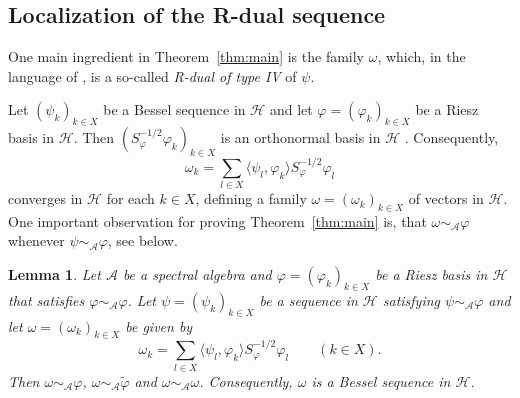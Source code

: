 \documentclass{amsart}
\newtheorem{lem.}[theorem]{Lemma}
\def\Hil{\mathcal{H}}
\newcommand{\A}[0]{{\mathcal{A}}}
\begin{document}
\subsection{Localization of the R-dual sequence}

One main ingredient in Theorem~\ref{thm:main} is the family $\omega$, which, in the language of \cite{r-duals}, is a so-called \emph{R-dual of type IV} of $\psi$. 

Let $(\psi_k)_{k\in X}$ be a Bessel sequence in $\Hil$ and let $\varphi = (\varphi_k)_{k\in X}$ be a Riesz basis in $\Hil$. Then $(S_{\varphi}^{-1/2}\varphi_k)_{k\in X}$ is an orthonormal basis in $\Hil$ \cite{ole1n}. Consequently, 
$$\omega_k = \sum_{l\in X}\langle \psi_l , \varphi_k \rangle S_{\varphi}^{- {1}/{2}}\varphi_l$$
converges in $\Hil$ for each $k\in X$, defining a family $\omega = (\omega_k)_{k\in X}$ of vectors in $\Hil$. One important observation for proving Theorem~\ref{thm:main} is, that %
$\omega \sim_{\A}\varphi$ whenever $\psi \sim_{\A}\varphi$, see below. %

\begin{lem.}\label{omegalocalization}
Let $\A$ be a spectral algebra and $\varphi = (\varphi_k)_{k\in X}$ be a Riesz basis in $\Hil$ that satisfies $\varphi\sim_{\A}\varphi$. Let $\psi = (\psi_k)_{k\in X}$ be a sequence in $\Hil$ satisfying $\psi \sim_{\A} \varphi$ and let $\omega = (\omega_k)_{k\in X}$ be given by 
$$\omega_k = \sum_{l\in X}\langle \psi_l , \varphi_k \rangle S_{\varphi}^{- {1}/{2}}\varphi_l \qquad (k\in X).$$
Then $\omega \sim_{\A}\varphi$, $\omega \sim_{\A}\widetilde{\varphi}$ and $\omega \sim_{\A}\omega$. Consequently, $\omega$ is a Bessel sequence in $\Hil$.
\end{lem.}
\end{document}
